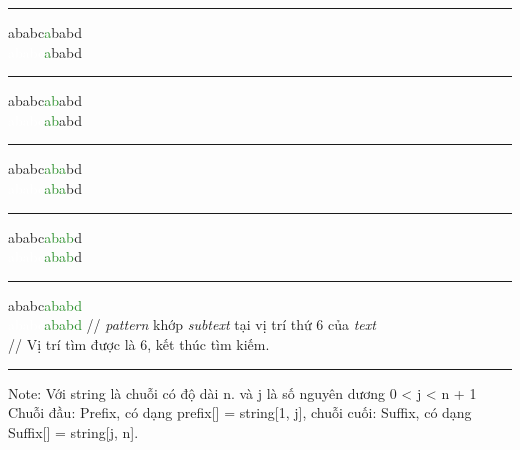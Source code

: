 \documentclass[a4paper,11pt]{article}
\begin{document}
			\vspace*{2mm}
			\hrule
			ababc\textcolor{ForestGreen}{a}babd\\
			\textcolor{white}{ababc}\textcolor{ForestGreen}{a}babd 

			\vspace*{2mm}
			\hrule
			ababc\textcolor{ForestGreen}{ab}abd\\
			\textcolor{white}{ababc}\textcolor{ForestGreen}{ab}abd 

			\vspace*{2mm}
			\hrule
			ababc\textcolor{ForestGreen}{aba}bd\\
			\textcolor{white}{ababc}\textcolor{ForestGreen}{aba}bd 

			\vspace*{2mm}
			\hrule
			ababc\textcolor{ForestGreen}{abab}d\\
			\textcolor{white}{ababc}\textcolor{ForestGreen}{abab}d 

			\vspace*{2mm}
			\hrule
			ababc\textcolor{ForestGreen}{ababd}\\
			\textcolor{white}{ababc}\textcolor{ForestGreen}{ababd} 				\hspace*{0.8cm} // \textit{pattern} khớp \textit{subtext} tại vị trí thứ 6 của \textit{text}\\
															\hspace*{2.9cm} // Vị trí tìm được là 6, kết thúc tìm kiếm.
			
			\vspace*{2mm}
			\hrule			
		
			Note: Với string là chuỗi có độ dài n. và j là số nguyên dương 0 < j < n + 1\\
			Chuỗi đầu: Prefix, có dạng prefix[] = string[1, j], chuỗi cuối: Suffix, có dạng Suffix[] = string[j, n].
				
\end{document}
